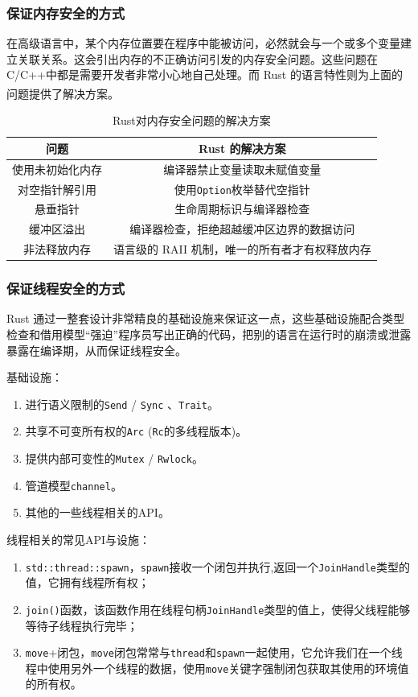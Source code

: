 \documentclass[UTF8,fontset=none,linespread=1.15]{ctexart}
\let\nosupcite\cite
\renewcommand*{\cite}[1]{\textsuperscript{\nosupcite{#1}}}
\begin{document}
\subsubsection{保证内存安全的方式}
在高级语言中，某个内存位置要在程序中能被访问，必然就会与一个或多个变量建立关联关系。这会引出内存的不正确访问引发的内存安全问题。这些问题在C/C++中都是需要开发者非常小心地自己处理。而 Rust 的语言特性则为上面的问题提供了解决方案。\cite{8}
\begin{table}[H]
\centering
\caption{Rust对内存安全问题的解决方案}
\begin{tabular}{|c|c|}
\hline
\textbf{问题} & \textbf{Rust 的解决方案}\\\hline
使用未初始化内存&编译器禁止变量读取未赋值变量\\\hline
对空指针解引用&使用\texttt{Option}枚举替代空指针\\\hline
悬垂指针&生命周期标识与编译器检查\\\hline
缓冲区溢出&编译器检查，拒绝超越缓冲区边界的数据访问\\\hline
非法释放内存&语言级的 RAII 机制，唯一的所有者才有权释放内存\\\hline
\end{tabular}
\end{table}
\subsubsection{保证线程安全的方式}
Rust 通过一整套设计非常精良的基础设施来保证这一点，这些基础设施配合类型检查和借用模型“强迫”程序员写出正确的代码，把别的语言在运行时的崩溃或泄露暴露在编译期，从而保证线程安全。

\noindent 基础设施：

\begin{enumerate}
\item 进行语义限制的\texttt{Send} / \texttt{Sync} 、\texttt{Trait}。
\item 共享不可变所有权的\texttt{Arc} (\texttt{Rc}的多线程版本)。
\item 提供内部可变性的\texttt{Mutex} / \texttt{Rwlock}。
\item 管道模型\texttt{channel}。
\item 其他的一些线程相关的API。
\end{enumerate}

\noindent 线程相关的常见API与设施：

\begin{enumerate}
\item \texttt{std::thread::spawn}，\texttt{spawn}接收一个闭包并执行,返回一个\texttt{JoinHandle}类型的值，它拥有线程所有权；
\item  \texttt{join()}函数，该函数作用在线程句柄\texttt{JoinHandle}类型的值上，使得父线程能够等待子线程执行完毕；
\item \texttt{move}+闭包，\texttt{move}闭包常常与\texttt{thread}和\texttt{spawn}一起使用，它允许我们在一个线程中使用另外一个线程的数据，使用\texttt{move}关键字强制闭包获取其使用的环境值的所有权。
\end{enumerate}
\end{document}
